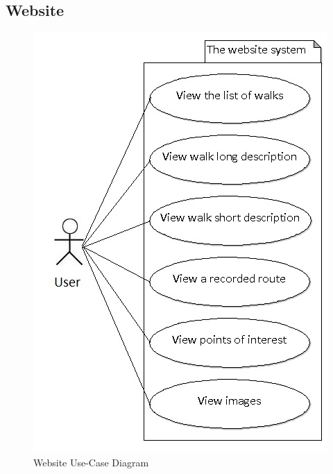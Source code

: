 \documentclass[12pt]{article}
\begin{document}
\subsection{Website}
\clearpage
\begin{figure}[htp]
\centering
\includegraphics[scale=0.60]{Project_Plan/docs/website_use_case.jpg}
\caption{Website Use-Case Diagram}
\label{Website Use-Case Diagram}
\end{figure}
\end{document}
